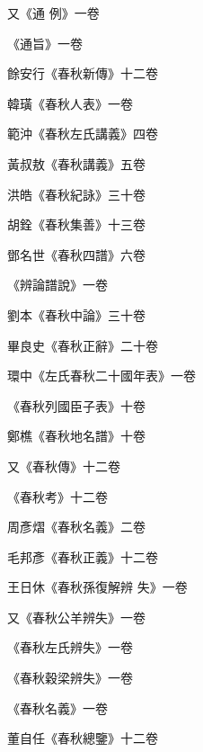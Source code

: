 \begin{pinyinscope}
 又《通
 例》一卷



 《通旨》一卷



 餘安行《春秋新傳》十二卷



 韓璜《春秋人表》一卷



 範沖《春秋左氏講義》四卷



 黃叔敖《春秋講義》五卷



 洪皓《春秋紀詠》三十卷



 胡銓《春秋集善》十三卷



 鄧名世《春秋四譜》六卷



 《辨論譜說》一卷



 劉本《春秋中論》三十卷



 畢良史《春秋正辭》二十卷



 環中《左氏春秋二十國年表》一卷



 《春秋列國臣子表》十卷



 鄭樵《春秋地名譜》十卷



 又《春秋傳》十二卷



 《春秋考》十二卷



 周彥熠《春秋名義》二卷



 毛邦彥《春秋正義》十二卷



 王日休《春秋孫復解辨
 失》一卷



 又《春秋公羊辨失》一卷



 《春秋左氏辨失》一卷



 《春秋穀梁辨失》一卷



 《春秋名義》一卷



 董自任《春秋總鑒》十二卷




\end{pinyinscope}
